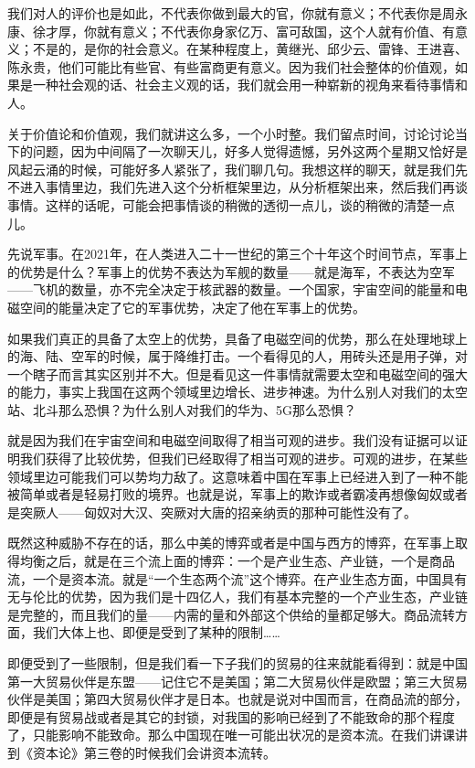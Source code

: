 \documentclass[UTF8, 12pt, a4paper]{ctexrep}
\begin{document}
我们对人的评价也是如此，不代表你做到最大的官，你就有意义；不代表你是周永康、徐才厚，你就有意义；不代表你身家亿万、富可敌国，这个人就有价值、有意义；不是的，是你的社会意义。在某种程度上，黄继光、邱少云、雷锋、王进喜、陈永贵，他们可能比有些官、有些富商更有意义。因为我们社会整体的价值观，如果是一种社会观的话、社会主义观的话，我们就会用一种崭新的视角来看待事情和人。

关于价值论和价值观，我们就讲这么多，一个小时整。我们留点时间，讨论讨论当下的问题，因为中间隔了一次聊天儿，好多人觉得遗憾，另外这两个星期又恰好是风起云涌的时候，可能好多人紧张了，我们聊几句。我想这样的聊天，就是我们先不进入事情里边，我们先进入这个分析框架里边，从分析框架出来，然后我们再谈事情。这样的话呢，可能会把事情谈的稍微的透彻一点儿，谈的稍微的清楚一点儿。

先说军事。在2021年，在人类进入二十一世纪的第三个十年这个时间节点，军事上的优势是什么？军事上的优势不表达为军舰的数量——就是海军，不表达为空军——飞机的数量，亦不完全决定于核武器的数量。一个国家，宇宙空间的能量和电磁空间的能量决定了它的军事优势，决定了他在军事上的优势。

如果我们真正的具备了太空上的优势，具备了电磁空间的优势，那么在处理地球上的海、陆、空军的时候，属于降维打击。一个看得见的人，用砖头还是用子弹，对一个瞎子而言其实区别并不大。但是看见这一件事情就需要太空和电磁空间的强大的能力，事实上我国在这两个领域里边增长、进步神速。为什么别人对我们的太空站、北斗那么恐惧？为什么别人对我们的华为、5G那么恐惧？

就是因为我们在宇宙空间和电磁空间取得了相当可观的进步。我们没有证据可以证明我们获得了比较优势，但我们已经取得了相当可观的进步。可观的进步，在某些领域里边可能我们可以势均力敌了。这意味着中国在军事上已经进入到了一种不能被简单或者是轻易打败的境界。也就是说，军事上的欺诈或者霸凌再想像匈奴或者是突厥人——匈奴对大汉、突厥对大唐的招亲纳贡的那种可能性没有了。

既然这种威胁不存在的话，那么中美的博弈或者是中国与西方的博弈，在军事上取得均衡之后，就是在三个流上面的博弈：一个是产业生态、产业链，一个是商品流，一个是资本流。就是“一个生态两个流”这个博弈。在产业生态方面，中国具有无与伦比的优势，因为我们是十四亿人，我们有基本完整的一个产业生态，产业链是完整的，而且我们的量——内需的量和外部这个供给的量都足够大。商品流转方面，我们大体上也、即便是受到了某种的限制……

即便受到了一些限制，但是我们看一下子我们的贸易的往来就能看得到：就是中国第一大贸易伙伴是东盟——记住它不是美国；第二大贸易伙伴是欧盟；第三大贸易伙伴是美国；第四大贸易伙伴才是日本。也就是说对中国而言，在商品流的部分，即便是有贸易战或者是其它的封锁，对我国的影响已经到了不能致命的那个程度了，只能影响不能致命。那么中国现在唯一可能出状况的是资本流。在我们讲课讲到《资本论》第三卷的时候我们会讲资本流转。
\end{document}
